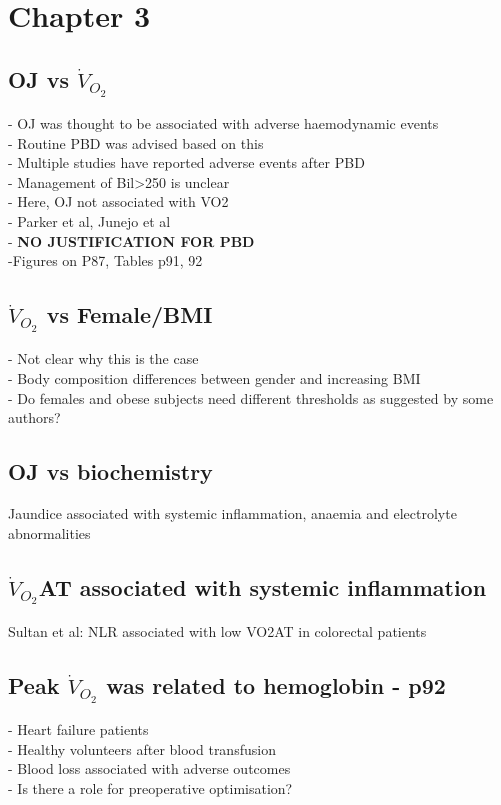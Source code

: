 \documentclass[12pt,a4paper]{article}
\author{Vishnu V Chandrabalan}
\begin{document}
\section{Chapter 3}

\subsection{OJ vs $\dot{V}_{O_2}$}
	- OJ was thought to be associated with adverse haemodynamic events\\
	- Routine PBD was advised based on this\\
	- Multiple studies have reported adverse events after PBD\\
	- Management of Bil>250 is unclear\\
	- Here, OJ not associated with VO2\\
	- Parker et al, Junejo et al\\
	- \textbf{NO JUSTIFICATION FOR PBD}\\
	-Figures on P87, Tables p91, 92

\subsection{$\dot{V}_{O_2}$ vs Female/BMI}
	- Not clear why this is the case\\
	- Body composition differences between gender and increasing BMI\\
	- Do females and obese subjects need different thresholds as suggested by some authors?

\subsection{OJ vs biochemistry}
	Jaundice associated with systemic inflammation, anaemia and electrolyte abnormalities 

\subsection{ $\dot{V}_{O_2}$AT associated with systemic inflammation}
	Sultan et al: NLR associated with low VO2AT in colorectal patients
	
\subsection{Peak $\dot{V}_{O_2}$ was related to hemoglobin - p92}
	- Heart failure patients\\
	- Healthy volunteers after blood transfusion\\
	- Blood loss associated with adverse outcomes\\
	- Is there a role for preoperative optimisation?
	
\end{document}
